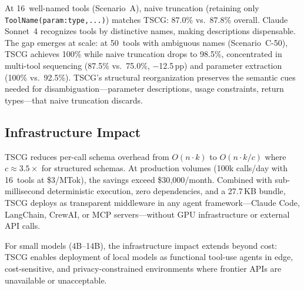 At 16~well-named tools (Scenario~A), naive truncation (retaining only \texttt{ToolName(param:type,...)}) matches TSCG: 87.0\% vs.\ 87.8\% overall.
Claude Sonnet~4 recognizes tools by distinctive names, making descriptions dispensable.
The gap emerges at scale: at 50~tools with ambiguous names (Scenario~C-50), TSCG achieves 100\% while naive truncation drops to 98.5\%, concentrated in multi-tool sequencing (87.5\% vs.\ 75.0\%, $-$12.5\,pp) and parameter extraction (100\% vs.\ 92.5\%).
TSCG's structural reorganization preserves the semantic cues needed for disambiguation---parameter descriptions, usage constraints, return types---that naive truncation discards.

\subsection{Infrastructure Impact}
\label{sec:infrastructure-discussion}

TSCG reduces per-call schema overhead from $O(n \cdot k)$ to $O(n \cdot k/c)$ where $c \approx 3.5\times$ for structured schemas.
At production volumes (100k calls/day with 16~tools at \$3/MTok), the savings exceed \$30{,}000/month.
Combined with sub-millisecond deterministic execution, zero dependencies, and a 27.7\,KB bundle, TSCG deploys as transparent middleware in any agent framework---Claude Code, LangChain, CrewAI, or MCP servers---without GPU infrastructure or external API calls.

For small models (4B--14B), the infrastructure impact extends beyond cost: TSCG enables deployment of local models as functional tool-use agents in edge, cost-sensitive, and privacy-constrained environments where frontier APIs are unavailable or unacceptable.
